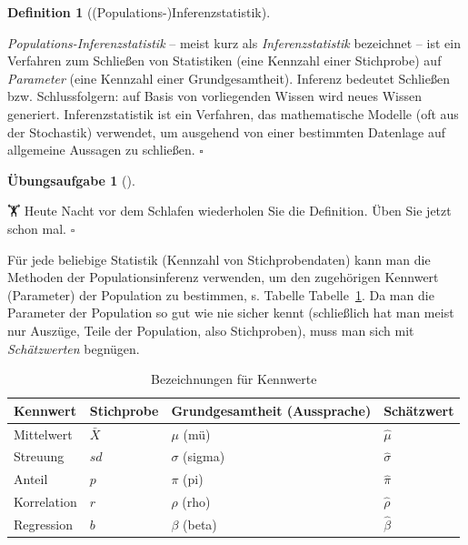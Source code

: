 \documentclass[
  ngerman,
  letterpaper,
  twoside,
  open=any]{scrbook}
\theoremstyle{definition}
\theoremstyle{plain}
\theoremstyle{definition}
\newtheorem{exercise}{Übungsaufgabe}[chapter]
\theoremstyle{definition}
\newtheorem{definition}{Definition}[chapter]
\theoremstyle{remark}
\begin{document}
\begin{definition}[(Populations-)Inferenzstatistik]\protect\hypertarget{def-inf}{}\label{def-inf}

\emph{Populations-Inferenzstatistik} -- meist kurz als
\emph{Inferenzstatistik} bezeichnet -- ist ein Verfahren zum Schließen
von Statistiken (eine Kennzahl einer Stichprobe) auf \emph{Parameter}
(eine Kennzahl einer Grundgesamtheit). Inferenz bedeutet Schließen bzw.
Schlussfolgern: auf Basis von vorliegenden Wissen wird neues Wissen
generiert. Inferenzstatistik ist ein Verfahren, das mathematische
Modelle (oft aus der Stochastik) verwendet, um ausgehend von einer
bestimmten Datenlage auf allgemeine Aussagen zu schließen. \(\square\)

\end{definition}

\begin{exercise}[]\protect\hypertarget{exr-inf}{}\label{exr-inf}

🏋️️ Heute Nacht vor dem Schlafen wiederholen Sie die Definition. Üben Sie
jetzt schon mal. \(\square\)

\end{exercise}

Für jede beliebige Statistik (Kennzahl von Stichprobendaten) kann man
die Methoden der Populationsinferenz verwenden, um den zugehörigen
Kennwert (Parameter) der Population zu bestimmen, s. Tabelle
Tabelle~\ref{tbl-kennwerte}. Da man die Parameter der Population so gut
wie nie sicher kennt (schließlich hat man meist nur Auszüge, Teile der
Population, also Stichproben), muss man sich mit \emph{Schätzwerten}
begnügen.

{

\begin{longtable}[]{@{}llll@{}}

\caption{\label{tbl-kennwerte}Bezeichnungen für Kennwerte}

\tabularnewline

\toprule\noalign{}
Kennwert & Stichprobe & Grundgesamtheit (Aussprache) & Schätzwert \\
\midrule\noalign{}
\endhead
\bottomrule\noalign{}
\endlastfoot
Mittelwert & \(\bar{X}\) & \(\mu\) (mü) & \(\hat{\mu}\) \\
Streuung & \(sd\) & \(\sigma\) (sigma) & \(\hat{\sigma}\) \\
Anteil & \(p\) & \(\pi\) (pi) & \(\hat{\pi}\) \\
Korrelation & \(r\) & \(\rho\) (rho) & \(\hat{\rho}\) \\
Regression & \(b\) & \(\beta\) (beta) & \(\hat{\beta}\) \\

\end{longtable}

}
\end{document}
